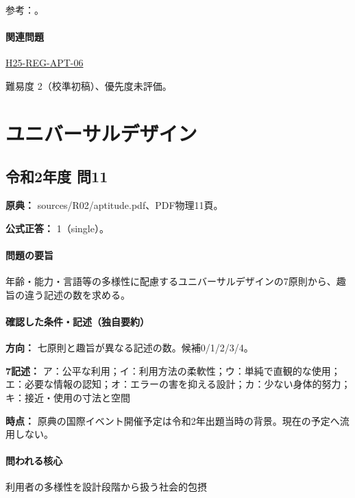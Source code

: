 \par 参考：\cite{iso26000,iso_gri2014}。

\paragraph{関連問題} \hyperref[q:h25-reg-apt-06]{H25-REG-APT-06}

\par 難易度 2（校準初稿）、優先度未評価。

\section{ユニバーサルデザイン}

\subsection{令和2年度 問11}
\label{q:r02-reg-apt-11}

\noindent\textbf{原典：} sources/R02/aptitude.pdf、PDF物理11頁。

\textbf{公式正答：} 1（single）。

\paragraph{問題の要旨} 年齢・能力・言語等の多様性に配慮するユニバーサルデザインの7原則から、趣旨の違う記述の数を求める。

\paragraph{確認した条件・記述（独自要約）}\mbox{}\par

\noindent\textbf{方向：} 七原則と趣旨が異なる記述の数。候補0/1/2/3/4。\par

\noindent\textbf{7記述：} ア：公平な利用；イ：利用方法の柔軟性；ウ：単純で直観的な使用；エ：必要な情報の認知；オ：エラーの害を抑える設計；カ：少ない身体的努力；キ：接近・使用の寸法と空間\par

\noindent\textbf{時点：} 原典の国際イベント開催予定は令和2年出題当時の背景。現在の予定へ流用しない。\par

\paragraph{問われる核心} 利用者の多様性を設計段階から扱う社会的包摂

